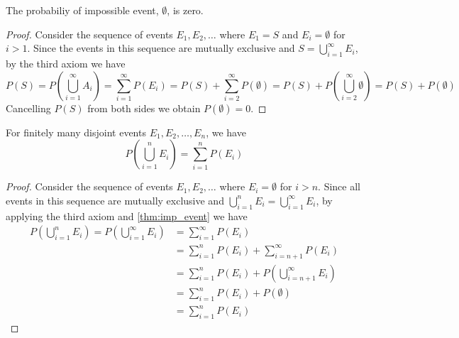 \begin{theorem}\label{thm:imp_event}
	The probabiliy of impossible event, \( \emptyset \), is zero.
\end{theorem}
\begin{proof}
	Consider the sequence of events \( E_1, E_2, \ldots \) where \( E_1 = S \) and \( E_i = \emptyset \) for \( i > 1 \).
	Since the events in this sequence are mutually exclusive and \( S = \bigcup_{i = 1}^{\infty} E_i \), by the third axiom we have
	\[
	P(S) = P(\bigcup_{i = 1}^{\infty} A_i) = \sum_{i = 1}^{\infty} P(E_i) = P(S) + \sum_{i = 2}^{\infty} P(\emptyset) = P(S) + P(\bigcup_{i = 2}^{\infty}\emptyset) = P(S) + P(\emptyset)
	\]
	Cancelling \( P(S) \) from both sides we obtain \( P(\emptyset) = 0 \).
\end{proof}

\begin{theorem}\label{thm:finite_probs}
	For finitely many disjoint events \( E_1, E_2, \ldots, E_n \), we have
	\[
	P(\bigcup_{i = 1}^{n} E_i) = \sum_{i = 1}^{n} P(E_i)
	\]
\end{theorem}
\begin{proof}
	Consider the sequence of events \( E_1, E_2, \ldots \) where \( E_i = \emptyset \) for \( i > n \).
	Since all events in this sequence are mutually exclusive and \( \bigcup_{i = 1}^{n} E_i = \bigcup_{i = 1}^{\infty} E_i \),
	by applying the third axiom and \autoref{thm:imp_event} we have
	\begin{align*}
	P(\bigcup_{i = 1}^{n} E_i) = P(\bigcup_{i = 1}^{\infty} E_i) &= \sum_{i = 1}^{\infty} P(E_i)\\
	&= \sum_{i = 1}^{n} P(E_i) + \sum_{i = n + 1}^{\infty} P(E_i)\\
	&= \sum_{i = 1}^{n} P(E_i) + P(\bigcup_{i = n + 1}^{\infty} E_i)\\
	&= \sum_{i = 1}^{n} P(E_i) + P(\emptyset)\\
	&= \sum_{i = 1}^{n} P(E_i)
	\end{align*}
\end{proof}

